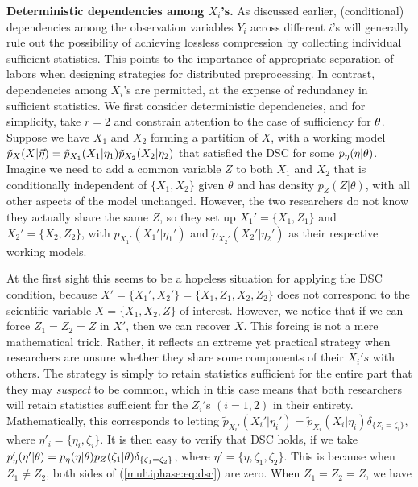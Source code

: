 \medskip
\noindent
{\bf Deterministic dependencies among $X_i$'s.}
As discussed earlier, (conditional) dependencies among the observation variables $Y_i$ across different $i$'s will generally rule out the possibility of achieving lossless compression by collecting individual sufficient statistics. This points to the importance of appropriate separation of labors when designing strategies for distributed preprocessing.
In contrast,  dependencies among $X_i$'s are  permitted, at the expense of redundancy in sufficient statistics.    
We first consider deterministic dependencies, and for simplicity, take $r = 2$ and constrain attention to the case of sufficiency for $\theta$.
 Suppose we have $X_1$ and $X_2$ forming a partition of   $X$, with a working model $\tilde{p}_X(X | \vec {\eta})=\tilde p_{X_1}(X_1 |\eta_1)\tilde p_{X_2}(X_2 |\eta_2) $ that satisfied the DSC for some $p_\eta(\eta | \theta)$.
 Imagine we need to add a common variable $Z$ to both $X_1$ and $X_2$ that is conditionally independent of $\{X_1, X_2\}$ given $\theta$ and has density $p_Z(Z|\theta)$, with all other aspects of the model unchanged.
However, the two researchers do not know they actually share the same $Z$, so they set up $X_1'=\{X_1, Z_1\}$ and $X_2'=\{X_2, Z_2\}$, with $p_{X_1'}(X_1' |\eta_1')$ and $\tilde p_{X_2'}(X_2' |\eta_2')$ as their respective working models.

At the first sight this seems to be a hopeless  situation for applying the DSC condition, because $X'=\{X_1', X_2'\}=\{X_1, Z_1, X_2, Z_2\}$ does not correspond to the scientific variable $X=\{X_1, X_2, Z\}$ of interest.
However, we notice that if we can force $Z_1=Z_2=Z$ in $X'$, then we can recover $X$.
This forcing is not a mere mathematical trick.
Rather, it reflects an extreme yet practical strategy when researchers are unsure whether they share some components of their $X_i's$ with others.
The strategy is simply to retain statistics sufficient for the entire part that they may \textit{suspect} to be common, which in this case means that both researchers will retain statistics sufficient for the $Z_i'$s $(i=1,2)$ in their entirety.
Mathematically, this corresponds to letting $\tilde p_{X_i'}(X_i' |\eta_i')= \tilde p_{X_i}(X_i |\eta_i)\delta_{\{Z_i=\zeta_i\}}$, where $\eta'_i=\{\eta_i,\zeta_i\}$.
 It is then easy to verify that DSC holds, if we take 
$p_\eta'(\eta' | \theta)=p_\eta(\eta | \theta)p_{Z}(\zeta_1|\theta)\delta_{\{\zeta_1=\zeta_2\}}$, where $\eta'=\{\eta, \zeta_1, \zeta_2\}.$ This is because when $Z_1\not= Z_2$,  both sides of (\ref{multiphase:eq:dsc}) are zero. When $Z_1=Z_2=Z$, we have 

